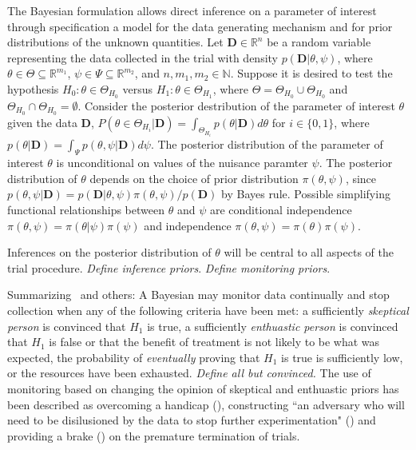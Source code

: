\documentclass[12pt]{article}
\begin{document}
The Bayesian formulation allows direct inference on a parameter of interest through specification a model for the data generating mechanism and for prior distributions of the unknown quantities. Let $\mathbf{D}\in\mathbb{R}^n$ be a random variable representing the data collected in the trial with density $p(\mathbf{D}|\theta,\psi)$, where $\theta\in\Theta\subseteq\mathbb{R}^{m_1}$, $\psi\in\Psi\subseteq\mathbb{R}^{m_2}$, and $n,m_1,m_2\in\mathbb{N}$. Suppose it is desired to test the hypothesis $H_0:\theta\in\Theta_{H_0}$ versus $H_1:\theta\in\Theta_{H_1}$, where $\Theta=\Theta_{H_0}\cup \Theta_{H_0}$ and $\Theta_{H_0}\cap \Theta_{H_0}=\emptyset$. Consider the posterior destribution of the parameter of interest $\theta$ given the data $\mathbf{D}$, $P(\theta\in\Theta_{H_i}|\mathbf{D})=\int_{\Theta_{H_i}}p(\theta|\mathbf{D})d\theta$ for $i\in\{0,1\}$, where $p(\theta|\mathbf{D})=\int_{\Psi}p(\theta,\psi|\mathbf{D})d\psi$. The posterior distribution of the parameter of interest $\theta$ is unconditional on values of the nuisance paramter $\psi$. The posterior distribution of $\theta$ depends on the choice of prior distribution $\pi(\theta,\psi)$, since $p(\theta,\psi|\mathbf{D})=p(\mathbf{D}|\theta,\psi)\pi(\theta,\psi)/p(\mathbf{D})$ by Bayes rule. Possible simplifying functional relationships between $\theta$ and $\psi$ are conditional independence $\pi(\theta,\psi)=\pi(\theta|\psi)\pi(\psi)$ and independence $\pi(\theta,\psi)=\pi(\theta)\pi(\psi)$.%

Inferences on the posterior distribution of $\theta$ will be central to all aspects of the trial procedure. \textit{Define inference priors}. \textit{Define monitoring priors}.

Summarizing~\cite{Spiegelhalter1993} and others: A Bayesian may monitor data continually and stop collection when any of the following criteria have been met: a sufficiently \textit{skeptical person} is convinced that $H_1$ is true, a sufficiently \textit{enthuastic person} is convinced that $H_1$ is false or that the benefit of treatment is not likely to be what was expected, the probability of \textit{eventually} proving that $H_1$ is true is sufficiently low, or the resources have been exhausted. \textit{Define all but convinced.} The use of monitoring based on changing the opinion of skeptical and enthuastic priors has been described as overcoming a handicap (\cite{Freedman1989}), constructing ``an adversary who will need to be disilusioned by the data to stop further experimentation" (\cite{Spiegelhalter1994}) and providing a brake (\cite{Fayers1997}) on the premature termination of trials.
\end{document}
